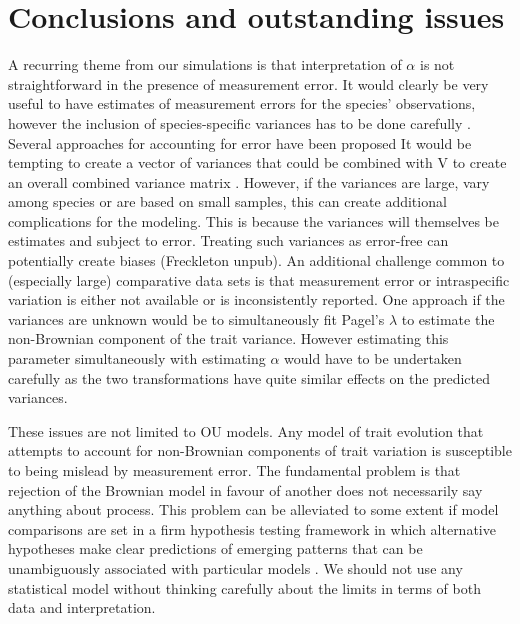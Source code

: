 \documentclass[a4paper,12pt]{article}
\begin{document}
\section{Conclusions and outstanding issues}
  A recurring theme from our simulations is that interpretation of $\alpha$ is not straightforward in the presence of measurement error. It would clearly be very useful to have estimates of measurement errors for the species’ observations, however the inclusion of species-specific variances has to be done carefully \citep[e.g.,][]{grafen1989phylogenetic}. Several approaches for accounting for error have been proposed %
  It would be tempting to create a vector of variances that could be combined with V to create an overall combined variance matrix \citep{o2012evolutionary,Harmon:2010aa}. However, if the variances are large, vary among species or are based on small samples, this can create additional complications for the modeling. This is because the variances will themselves be estimates and subject to error. Treating such variances as error-free can potentially create biases (Freckleton unpub). An additional challenge common to (especially large) comparative data sets is that measurement error or intraspecific variation is either not available or is inconsistently reported. One approach if the variances are unknown would be to simultaneously fit Pagel’s $\lambda$ \citep{Pagel:1997aa,Pagel:1999aa} to estimate the non-Brownian component of the trait variance. However estimating this parameter simultaneously with estimating $\alpha$ would have to be undertaken carefully as the two transformations have quite similar effects on the predicted variances. 

  These issues are not limited to OU models. Any model of trait evolution that attempts to account for non-Brownian components of trait variation is susceptible to being mislead by  measurement error. The fundamental problem is that rejection of the Brownian model in favour of another does not necessarily say anything about process. This problem can be alleviated to some extent if model comparisons are set in a firm hypothesis testing framework in which alternative hypotheses make clear predictions of emerging patterns that can be unambiguously associated with particular models \citep[e.g.,][]{Cooper:2011aa}. We should not use any statistical model without thinking carefully about the limits in terms of both data and interpretation. 

\end{document}
